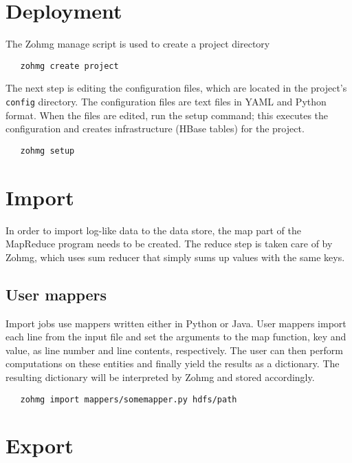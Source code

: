 \section{Deployment}

The Zohmg manage script is used to create a project directory

\begin{verbatim}
   zohmg create project
\end{verbatim}

\noindent The next step is editing the configuration files, which are located in
the project's \texttt{config} directory. The configuration files are text files
in YAML and Python format. When the files are edited, run the setup command;
this executes the configuration and creates infrastructure (HBase tables) for
the project.

\begin{verbatim}
   zohmg setup
\end{verbatim}


\section{Import}

In order to import log-like data to the data store, the map part of the
MapReduce program needs to be created. The reduce step is taken care of by
Zohmg, which uses sum reducer that simply sums up values with the same keys.


\subsection*{User mappers}

Import jobs use mappers written either in Python or Java. User mappers import
each line from the input file and set the arguments to the map function, key and
value, as line number and line contents, respectively. The user can then perform
computations on these entities and finally yield the results as a dictionary.
The resulting dictionary will be interpreted by Zohmg and stored accordingly.

\begin{verbatim}
   zohmg import mappers/somemapper.py hdfs/path
\end{verbatim}


\section{Export}

